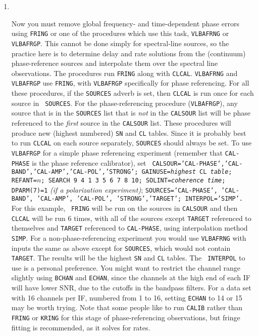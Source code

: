 \begin{enumerate}
\item\ {Now you must remove global frequency- and time-dependent phase
errors using {\tt FRING} or one of the procedures which use this task,
{\tt VLBAFRNG} or {\tt VLBAFRGP}\@. This cannot be done simply for
spectral-line sources, so the practice here is to determine delay and
rate solutions from the (continuum) phase-reference sources and
interpolate them over the spectral line observations.  The procedures
run {\tt FRING} along with {\tt CLCAL}\@.  {\tt VLBAFRNG} and {\tt
  VLBAFRGP} use {\tt FRING}, with {\tt VLBAFRGP} specifically for
phase referencing.  For all these procedures, if the {\tt SOURCES}
adverb is set, then {\tt CLCAL} is run once for each source in {\tt
  SOURCES}\@.  For the phase-referencing procedure ({\tt VLBAFRGP}),
any source that is in the {\tt SOURCES} list that is {\it not\/} in
the {\tt CALSOUR} list will be phase referenced to the {\it first}
source in the {\tt CALSOUR} list.  These procedures will produce new
(highest numbered) {\tt SN} and {\tt CL} tables.  Since it is probably
best to run {\tt CLCAL} on each source separately, {\tt SOURCES}
should always be set.  To use {\tt VLBAFRGP} for a simple phase
referencing experiment (remember that {\tt CAL-PHASE} is the phase
reference calibrator), set {\tt
  CALSOUR='CAL-PHASE','CAL-BAND','CAL-AMP','CAL-POL','STRONG';
  GAINUSE={\it highest} CL {\it table}; REFANT=$n$; SEARCH 9 4 1 3 5 6 7
8 10; SOLINT={\it coherence time}; DPARM(7)=1} {\it (if a polarization
experiment)}; {\tt SOURCES='CAL-PHASE', 'CAL-BAND', 'CAL-AMP',
'CAL-POL', 'STRONG','TARGET'; INTERPOL='SIMP'.}  For this example, {\tt
FRING} will be run on the sources in {\tt CALSOUR} and then {\tt
CLCAL} will be run 6 times, with all of the sources except {\tt TARGET}
referenced to themselves and {\tt TARGET} referenced to {\tt CAL-PHASE},
using interpolation method {\tt SIMP}\@.  For a non-phase-referencing
experiment you would use {\tt VLBAFRNG} with inputs the same as above
except for {\tt SOURCES}, which would not contain {\tt TARGET}\@.  The
results will be the highest {\tt SN} and {\tt CL} tables.  The {\tt
INTERPOL} to use is a personal preference.  You might want to
restrict the channel range slightly using {\tt BCHAN} and {\tt ECHAN},
since the channels at the high end of each IF will have lower SNR, due
to the cutoffs in the bandpass filters.  For a data set with 16
channels per IF, numbered from 1 to 16, setting {\tt ECHAN} to 14 or
15 may be worth trying.  Note that some people like to run {\tt CALIB}
rather than {\tt FRING} or {\tt KRING} for this stage of
phase-referencing observations, but fringe fitting is recommended, as
it solves for rates.

}
\end{enumerate}

